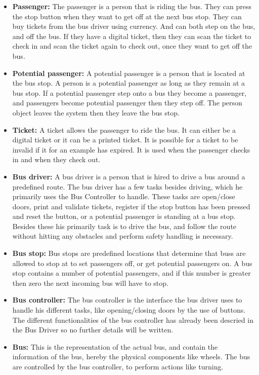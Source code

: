 \begin{itemize}
\item \textbf{Passenger:}
The passenger is a person that is riding the bus. They can press the stop button when they want to get off at the next bus stop. They can buy tickets from the bus driver using currency. And can both step on the bus, and off the bus. If they have a digital ticket, then they can scan the ticket to check in and scan the ticket again to check out, once they want to get off the bus.
\item \textbf{Potential passenger:}
A potential passenger is a person that is located at the bus stop. A person is a potential passenger as long as they remain at a bus stop. If a potential passenger step onto a bus they become a passenger, and passengers become potential passenger then they step off. The person object leaves the system then they leave the bus stop.
\item \textbf{Ticket:}
A ticket allows the passenger to ride the bus. It can either be a digital ticket or it can be a printed ticket. It is possible for a ticket to be invalid if it for an example has expired. It is used when the passenger checks in and when they check out.
\item \textbf{Bus driver:}
A bus driver is a person that is hired to drive a bus around a predefined route. The bus driver has a few tasks besides driving, which he primarily uses the Bus Controller to handle. These tasks are open/close doors, print and validate tickets, register if the stop button has been pressed and reset the button, or a potential passenger is standing at a bus stop. Besides these his primarily task is to drive the bus, and follow the route without hitting any obstacles and perform safety handling is necessary.
\item \textbf{Bus stop:}
Bus stops are predefined locations that determine that buss are allowed to stop at to set passengers off, or get potential passengers on. A bus stop contains a number of potential passengers, and if this number is greater then zero the next incoming bus will have to stop.
\item \textbf{Bus controller:}
The bus controller is the interface the bus driver uses to handle his different tasks, like opening/closing doors by the use of buttons. The different functionalities of the bus controller has already been descried in the Bus Driver so no further details will be written.
\item \textbf{Bus:}
This is the representation of the actual bus, and contain the information of the bus, hereby the physical components like wheels. The bus are controlled by the bus controller, to perform actions like turning.
\end{itemize}


